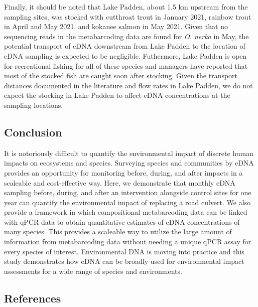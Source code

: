\documentclass[
]{article}
\begin{document}
Finally, it should be noted that Lake Padden, about 1.5 km upstream from
the sampling sites, was stocked with cutthroat trout in January 2021,
rainbow trout in April and May 2021, and kokanee salmon in May 2021.
Given that no sequencing reads in the metabarcoding data are found for
\emph{O. nerka} in May, the potential transport of eDNA downstream from
Lake Padden to the location of eDNA sampling is expected to be
negligible. Futhermore, Lake Padden is open for recreational fishing for
all of these species and managers have reported that most of the stocked
fish are caught soon after stocking. Given the transport distances
documented in the literature and flow rates in Lake Padden, we do not
expect the stocking in Lake Padden to affect eDNA concentrations at the
sampling locations.

\hypertarget{conclusion}{%
\subsection{Conclusion}\label{conclusion}}

It is notoriously difficult to quantify the environmental impact of
discrete human impacts on ecosystems and species. Surveying species and
communities by eDNA provides an opportunity for monitoring before,
during, and after impacts in a scaleable and cost-effective way. Here,
we demonstrate that monthly eDNA sampling before, during, and after an
intervention alongside control sites for one year can quantify the
environmental impact of replacing a road culvert. We also provide a
framework in which compositional metabarcoding data can be linked with
qPCR data to obtain quantitative estimates of eDNA concentrations of
many species. This provides a scaleable way to utilize the large amount
of information from metabarcoding data without needing a unique qPCR
assay for every species of interest. Environmental DNA is moving into
practice and this study demonstrates how eDNA can be broadly used for
environmental impact assessments for a wide range of species and
environments.

\hypertarget{references}{%
\subsection*{References}\label{references}}
\end{document}
